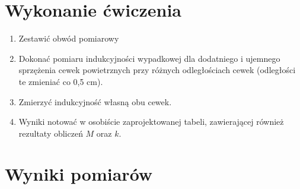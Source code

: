 \documentclass[a4paper,10pt,twoside]{article}
\begin{document}
	\section{Wykonanie ćwiczenia}
	
	\begin{enumerate}
		\item Zestawić obwód pomiarowy
		\item Dokonać pomiaru indukcyjności wypadkowej dla dodatniego i ujemnego sprzężenia cewek powietrznych przy różnych odległościach cewek (odległości te zmieniać co 0,5 cm).
		\item Zmierzyć indukcyjność własną obu cewek.
		\item Wyniki notować w osobiście zaprojektowanej tabeli, zawierającej również rezultaty obliczeń $M$ oraz $k$.
	\end{enumerate}
\newpage
	
	\section{Wyniki pomiarów}
	
\end{document}
